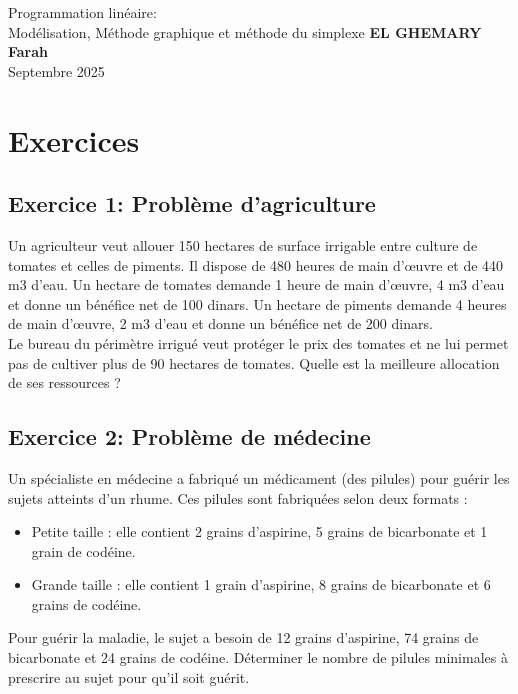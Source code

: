\documentclass[]{book}
\begin{document}
\begin{center}
{\Large Programmation linéaire:\\ Modélisation, Méthode graphique et méthode du simplexe}
\newline
\newline
\textbf{EL GHEMARY Farah}\\ 
Septembre 2025
\end{center}

\vspace{0.2 cm}



\section{Exercices}

\subsection*{Exercice 1:  Problème d’agriculture}
Un agriculteur veut allouer 150 hectares de surface irrigable entre culture de tomates et celles de piments. Il dispose de 480 heures de main d’œuvre et de 440 m3 d’eau. Un hectare de tomates demande 1 heure de main d’œuvre, 4 m3 d’eau et donne un bénéfice net de 100 dinars. Un hectare de piments demande 4 heures de main d’œuvre, 2 m3 d’eau et donne un bénéfice net de 200 dinars.
\\
Le bureau du périmètre irrigué veut protéger le prix des tomates et ne lui permet pas de cultiver plus de 90 hectares de tomates. Quelle est la meilleure allocation de ses ressources ? 

\subsection*{Exercice 2: Problème de médecine }
Un spécialiste en médecine a fabriqué un médicament (des pilules) pour guérir les sujets atteints d’un rhume. Ces pilules sont fabriquées selon deux formats :
\begin{itemize}
    \item Petite taille : elle contient 2 grains d’aspirine, 5 grains de bicarbonate et 1 grain de codéine.
    \item Grande taille : elle contient 1 grain d’aspirine, 8 grains de bicarbonate et 6 grains de codéine.
\end{itemize}
Pour guérir la maladie, le sujet a besoin de 12 grains d’aspirine, 74 grains de bicarbonate et 24 grains de codéine. Déterminer le nombre de pilules minimales à prescrire au sujet pour qu’il soit guérit.
\end{document}
